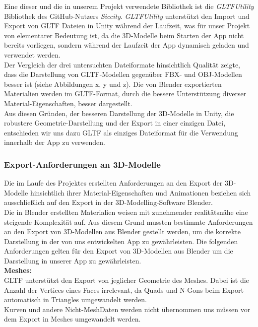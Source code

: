 \documentclass[12pt,a4paper]{article}
\begin{document}
Eine dieser und die in unserem Projekt verwendete Bibliothek ist die \textit{GLTFUtility} Bibliothek des GitHub-Nutzers \textit{Siccity}. \textit{GLTFUtility} unterstützt den Import und Export von GLTF Dateien in Unity während der Laufzeit, was für unser Projekt von elementarer Bedeutung ist, da die 3D-Modelle beim Starten der App nicht bereits vorliegen, sondern während der Laufzeit der App dynamisch geladen und verwendet werden.\\

Der Vergleich der drei untersuchten Dateiformate hinsichtlich Qualität zeigte, dass die Darstellung von GLTF-Modellen gegenüber FBX- und OBJ-Modellen besser ist (siehe Abbildungen x, y und z). Die von Blender exportierten Materialien werden im GLTF-Format, durch die bessere Unterstützung diverser Material-Eigenschaften, besser dargestellt.\\

Aus diesen Gründen, der besseren Darstellung der 3D-Modelle in Unity, die robustere Geometrie-Darstellung und der Export in einer einzigen Datei, entschieden wir uns dazu GLTF als einziges Dateiformat für die Verwendung innerhalb der App zu verwenden.
\subsubsection{Export-Anforderungen an 3D-Modelle}
Die im Laufe des Projektes erstellten Anforderungen an den Export der 3D-Modelle hinsichtlich ihrer Material-Eigenschaften und Animationen beziehen sich ausschließlich auf den Export in der 3D-Modelling-Software Blender.\\

Die in Blender erstellten Materialien weisen mit zunehmender realitätsnähe eine steigende Komplexität auf. Aus diesem Grund mussten bestimmte Anforderungen an den Export von 3D-Modellen aus Blender gestellt werden, um die korrekte Darstellung in der von uns entwickelten App zu gewährleisten. Die folgenden Anforderungen gelten für den Export von 3D-Modellen aus Blender um die Darstellung in unserer App zu gewährleisten.\\

\textbf{Meshes:}\\
GLTF unterstützt den Export von jeglicher Geometrie des Meshes. Dabei ist die Anzahl der Vertices eines Faces irrelevant, da Quads und N-Gons beim Export automatisch in Triangles umgewandelt werden.\\
Kurven und andere \glqq Nicht-Mesh\grqq Daten werden nicht übernommen uns müssen vor dem Export in Meshes umgewandelt werden.\\
\end{document}
